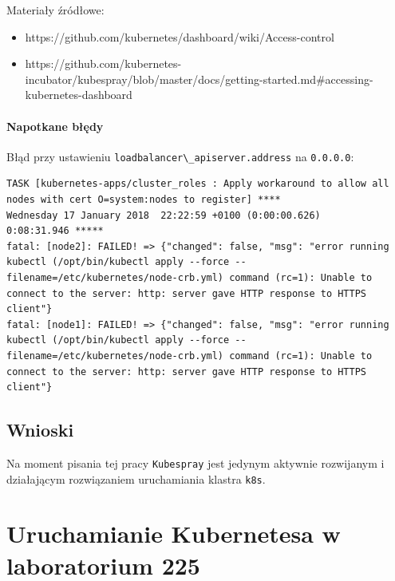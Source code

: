 \documentclass[a4paper,12pt,twoside,openany]{report}
\providecommand{\tightlist}{%
  \setlength{\itemsep}{0pt}\setlength{\parskip}{0pt}}
\newcommand{\passthrough}[1]{#1}
\begin{document}
Materiały źródłowe:

\begin{itemize}
\tightlist
\item
  https://github.com/kubernetes/dashboard/wiki/Access-control
\item
  https://github.com/kubernetes-incubator/kubespray/blob/master/docs/getting-started.md\#accessing-kubernetes-dashboard
\end{itemize}

\hypertarget{napotkane-bux142ux119dy-1}{%
\subsubsection{Napotkane błędy}\label{napotkane-bux142ux119dy-1}}

Błąd przy ustawieniu
\passthrough{\lstinline!loadbalancer\_apiserver.address!} na
\passthrough{\lstinline!0.0.0.0!}:

\begin{lstlisting}
TASK [kubernetes-apps/cluster_roles : Apply workaround to allow all nodes with cert O=system:nodes to register] ****
Wednesday 17 January 2018  22:22:59 +0100 (0:00:00.626)       0:08:31.946 *****
fatal: [node2]: FAILED! => {"changed": false, "msg": "error running kubectl (/opt/bin/kubectl apply --force --filename=/etc/kubernetes/node-crb.yml) command (rc=1): Unable to connect to the server: http: server gave HTTP response to HTTPS client"}
fatal: [node1]: FAILED! => {"changed": false, "msg": "error running kubectl (/opt/bin/kubectl apply --force --filename=/etc/kubernetes/node-crb.yml) command (rc=1): Unable to connect to the server: http: server gave HTTP response to HTTPS client"}
\end{lstlisting}

\hypertarget{wnioski-4}{%
\section{Wnioski}\label{wnioski-4}}

Na moment pisania tej pracy \passthrough{\lstinline!Kubespray!} jest
jedynym aktywnie rozwijanym i działającym rozwiązaniem uruchamiania
klastra \passthrough{\lstinline!k8s!}.

\hypertarget{uruchamianie-kubernetesa-w-laboratorium-225}{%
\chapter{Uruchamianie Kubernetesa w laboratorium
225}\label{uruchamianie-kubernetesa-w-laboratorium-225}}
\end{document}
